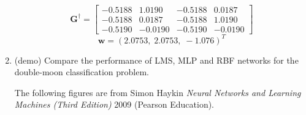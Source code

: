 \begin{enumerate}
\begin{solution}
    \begin{equation*}
      \mathbf{G}^\dagger=
      \left[
        \begin{array}{rrrr}
          -0.5188 & 1.0190 & -0.5188 &0.0187\\
          -0.5188 & 0.0187 & -0.5188 &1.0190\\
          -0.5190 & -0.0190 & -0.5190 &-0.0190
        \end{array}\right]
    \end{equation*}
    \begin{equation*}
      \mathbf{w}=(2.0753,\;2.0753,\;-1.076)^T
    \end{equation*}


  \end{solution}


\item (demo) Compare the performance of LMS, MLP and RBF networks for
  the double-moon classification problem.

  \begin{solution}
    The following figures are from Simon Haykin \emph{Neural Networks
      and Learning Machines (Third Edition)} 2009 (Pearson Education).
    

\end{solution}
\end{enumerate}
